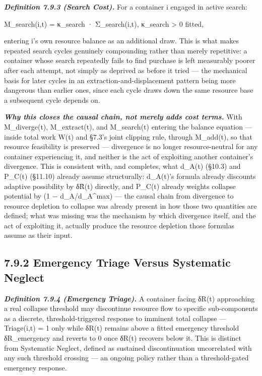 \documentclass[
]{article}
\begin{document}
\emph{\textbf{Definition 7.9.3 (Search Cost).}} For a container i
engaged in active search:

M\_search(i,t) = κ\_search · Σ\_search(i,t), κ\_search \textgreater{} 0
fitted,

entering i's own resource balance as an additional draw. This is what
makes repeated search cycles genuinely compounding rather than merely
repetitive: a container whose search repeatedly fails to find purchase
is left measurably poorer after each attempt, not simply as deprived as
before it tried --- the mechanical basis for later cycles in an
extraction-and-displacement pattern being more dangerous than earlier
ones, since each cycle draws down the same resource base a subsequent
cycle depends on.

\emph{\textbf{Why this closes the causal chain, not merely adds cost
terms.}} With M\_diverge(t), M\_extract(t), and M\_search(t) entering
the balance equation --- inside total work W(t) and §7.3's joint
clipping rule, through M\_add(t), so that resource feasibility is
preserved --- divergence is no longer resource-neutral for any
container experiencing it, and neither is the act of exploiting another
container's divergence. This is consistent with, and completes, what
d\_A(t) (§10.3) and P\_C(t) (§11.10) already assume structurally:
d\_A(t)'s formula already discounts adaptive possibility by δR̃(t)
directly, and P\_C(t) already weights collapse potential by (1 −
d\_A/d\_A\^{}max) --- the causal chain from divergence to resource
depletion to collapse was already present in how those two quantities
are defined; what was missing was the mechanism by which divergence
itself, and the act of exploiting it, actually produce the resource
depletion those formulas assume as their input.

\hypertarget{emergency-triage-versus-systematic-neglect}{%
\subsection{7.9.2 Emergency Triage Versus Systematic
Neglect}\label{emergency-triage-versus-systematic-neglect}}

\emph{\textbf{Definition 7.9.4 (Emergency Triage).}} A container facing
δR(t) approaching a real collapse threshold may discontinue resource
flow to specific sub-components as a discrete, threshold-triggered
response to imminent total collapse --- Triage(i,t) = 1 only while δR(t)
remains above a fitted emergency threshold δR\_emergency and reverts to
0 once δR(t) recovers below it. This is distinct from Systematic
Neglect, defined as sustained discontinuation uncorrelated with any such
threshold crossing --- an ongoing policy rather than a threshold-gated
emergency response.
\end{document}
